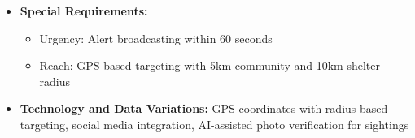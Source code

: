 \begin{itemize}
\begin{itemize}
        \item 4a. No nearby community: System expands alert radius
        \item 8a. Pet found: User marks alert as resolved
    \end{itemize}
    \item \textbf{Special Requirements:}
    \begin{itemize}
        \item Urgency: Alert broadcasting within 60 seconds
        \item Reach: GPS-based targeting with 5km community and 10km shelter radius
    \end{itemize}
    \item \textbf{Technology and Data Variations:} GPS coordinates with radius-based targeting, social media integration, AI-assisted photo verification for sightings
\end{itemize}

